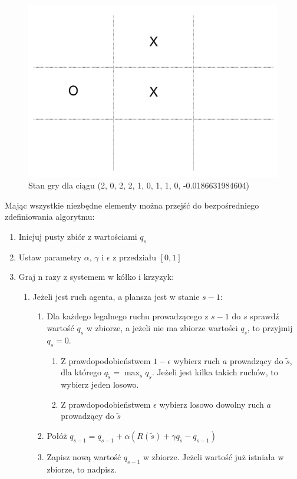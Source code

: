 \documentclass[licencjacka]{pracamgr}
\begin{document}
\begin{figure}[H]
	\includegraphics [scale=0.22] {ttt_5.png}
	\caption{Stan gry dla ciągu (2, 0, 2, 2, 1, 0, 1, 1, 0, -0.0186631984604) }
	\label{Rys13}
\end{figure}

Mając wszystkie niezbędne elementy można przejść do bezpośredniego zdefiniowania algorytmu:\\

\begin{enumerate}
	\item{Inicjuj pusty zbiór z wartościami $q_{s}$}
	\item{Ustaw parametry $\alpha$, $\gamma$  i $\epsilon$ z przedziału $[0, 1]$}
	\item{Graj n razy z systemem w kółko i krzyzyk:}
	\begin{enumerate}
		\item{Jeżeli jest ruch agenta, a plansza jest w stanie $s-1$:}
		\begin{enumerate}
			\item{Dla każdego legalnego ruchu prowadzącego z $s-1$ do $s$  sprawdź wartość $q_{s}$ w zbiorze, a jeżeli nie ma zbiorze wartości $q_{s}$, to przyjmij $q_{s}=0$.}
			\begin{enumerate}
					\item{Z prawdopodobieństwem $1-\epsilon$ wybierz ruch $a$ prowadzący do $\tilde{s}$, dla którego $q_{\tilde{s}} =\max_{s} q_{s}$. Jeżeli jest kilka takich ruchów, to wybierz jeden losowo.}
					\item{Z prawdopodobieństwem $\epsilon$ wybierz losowo dowolny ruch $a$ prowadzący do $\tilde{s}$}
			\end{enumerate}
			\item{Połóż $q_{s-1} = q_{s-1} + \alpha(R(\tilde{s}) + \gamma  q_{\tilde{s}} - q_{s-1} )$ }
			\item{Zapisz nową wartość $q_{s-1}$ w zbiorze. Jeżeli wartość już istniała w zbiorze, to nadpisz.}
		\end{enumerate}
	\end{enumerate}
\end{enumerate}
\end{document}
